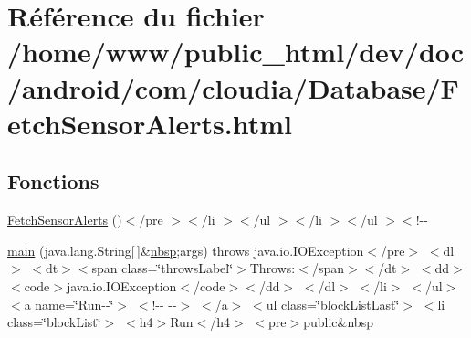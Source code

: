 \hypertarget{_database_2_fetch_sensor_alerts_8html}{\section{Référence du fichier /home/www/public\-\_\-html/dev/doc/android/com/cloudia/\-Database/\-Fetch\-Sensor\-Alerts.html}
\label{_database_2_fetch_sensor_alerts_8html}
}
\subsection*{Fonctions}
\begin{DoxyCompactItemize}
\item 
\hyperlink{_database_2_fetch_sensor_alerts_8html_a0ca9d44baa13a9bbfa02515b8fdcadc0}{Fetch\-Sensor\-Alerts} ()$<$/pre $>$$<$/li $>$$<$/ul $>$$<$/li $>$$<$/ul $>$$<$!-\/-\/
\item 
\hyperlink{_database_2_fetch_sensor_alerts_8html_a0096c0bd079e6b0a3d0a15d6429c3f59}{main} (java.\-lang.\-String\mbox{[}$\,$\mbox{]}\&\hyperlink{_tools_8html_aef915316f784c9063d942974538301a6}{nbsp};args)  throws java.\-io.\-I\-O\-Exception$<$/pre$>$ $<$dl$>$ $<$dt$>$$<$span class=\char`\"{}throws\-Label\char`\"{}$>$\-Throws\-:$<$/span$>$$<$/dt$>$ $<$dd$>$$<$code$>$java.\-io.\-I\-O\-Exception$<$/code$>$$<$/dd$>$ $<$/dl$>$ $<$/li$>$ $<$/ul$>$ $<$a name=\char`\"{}\-Run-\/-\/\char`\"{}$>$ $<$!-\/-\/   -\/-\/$>$ $<$/a$>$ $<$ul class=\char`\"{}block\-List\-Last\char`\"{}$>$ $<$li class=\char`\"{}block\-List\char`\"{}$>$ $<$h4$>$\-Run$<$/h4$>$ $<$pre$>$public\&nbsp
\item 
$$
\end{DoxyCompactItemize}
